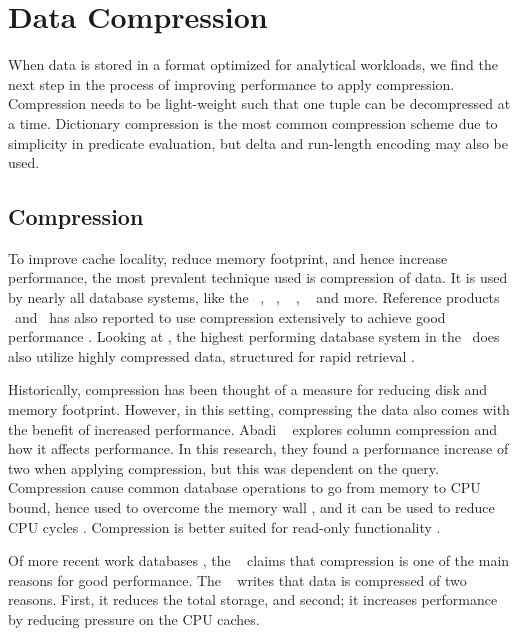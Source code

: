 \chapter{Data Compression}
\label{chap:Data Compression}
When data is stored in a format optimized for analytical workloads, we find the next step in the process of improving performance to apply compression. Compression needs to be light-weight such that one tuple can be decompressed at a time. Dictionary compression is the most common compression scheme due to simplicity in predicate evaluation, but delta and run-length encoding may also be used.
\newpage

\section{Compression}
\label{sec:Compression}
To improve cache locality, reduce memory footprint, and hence increase performance, the most prevalent technique used is compression of data. It is used by nearly all database systems, like the \ibm~\cite{Raman2013-em}, \cstore~\cite{Stonebraker2005-qz}, ~ \cite{Lamb2012-kg}, \oracle~\cite{Oracle2015-fs} and more. Reference products \tableau~and \qlikview~has also reported to use compression extensively to achieve good performance \cite{Kamkolkar2015-iq, Qlik2014-vd}. Looking at \exasol, the highest performing database system in the \tpch~does also utilize highly compressed data, structured for rapid retrieval \cite{Exasol2014-xh}. 

Historically, compression has been thought of a measure for reducing disk and memory footprint. However, in this setting, compressing the data also comes with the benefit of increased performance. Abadi \ea~\cite{Abadi2008-dd} explores column compression and how it affects performance. In this research, they found a performance increase of two  when applying compression, but this was dependent on the query. Compression cause common database operations to go from memory to CPU bound, hence used to overcome the memory wall \cite{Willhalm2009-hu}, and it can be used to reduce CPU cycles  \cite{Stonebraker2005-qz}. Compression is better suited for read-only functionality \cite{Westmann2000-mz}.

Of more recent work databases , the \gorilla~\cite{Pelkonen2015-ko} claims that compression is one of the main reasons for good performance. The \exasol~\cite{Exasol2014-xh} writes that data is compressed of two reasons. First, it reduces the total storage, and second; it increases performance by reducing pressure on the CPU caches. 

